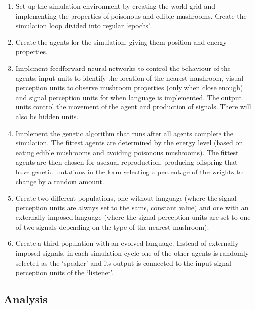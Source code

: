 \documentclass[12pt,a4paper,twoside]{article}
\begin{document}
\begin{enumerate}

\item Set up the simulation environment by creating the world grid and implementing the properties of poisonous and edible mushrooms. Create the simulation loop divided into regular `epochs'.

\item Create the agents for the simulation, giving them position and energy properties.

\item Implement feedforward neural networks to control the behaviour of the agents; input units to identify the location of the nearest mushroom, visual perception units to observe mushroom properties (only when close enough) and signal perception units for when language is implemented. The output units control the movement of the agent and production of signals. There will also be hidden units.

\item Implement the genetic algorithm that runs after all agents complete the simulation. The fittest agents are determined by the energy level (based on eating edible mushrooms and avoiding poisonous mushrooms). The fittest agents are then chosen for asexual reproduction, producing offspring that have genetic mutations in the form selecting a percentage of the weights to change by a random amount.

\item Create two different populations, one without language (where the signal perception units are always set to the same, constant value) and one with an externally imposed language (where the signal perception units are set to one of two signals depending on the type of the nearest mushroom).

\item Create a third population with an evolved language. Instead of externally imposed signals, in each simulation cycle one of the other agents is randomly selected as the `speaker' and its output is connected to the input signal perception units of the `listener'. 

\end{enumerate}

\subsection*{Analysis}
\end{document}
